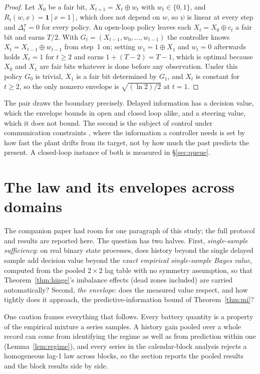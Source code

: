 \documentclass[11pt]{article}
\begin{document}
\begin{proof}
Let $X_0$ be a fair bit, $X_{t+1}=X_t\oplus w_t$ with $w_t\in\{0,1\}$, and
$R_t(w,x)=\mathbf 1[x=1]$, which does not depend on $w$, so
$\psi$ is linear at every step and $\Delta^\pi_t=0$ for every policy. An
open-loop policy leaves each $X_t=X_0\oplus c_t$ a fair bit and earns
$T/2$. With $G_t=(X_{t-1},w_0,\dots,w_{t-1})$ the controller knows
$X_t=X_{t-1}\oplus w_{t-1}$ from step~1 on; setting $w_1=1\oplus X_1$ and
$w_t=0$ afterwards holds $X_t=1$ for $t\ge2$ and earns $1+(T-2)=T-1$, which is
optimal because $X_0$ and $X_1$ are fair bits whatever is done before any
observation. Under this policy $G_0$ is trivial, $X_1$ is a fair bit
determined by $G_1$, and $X_t$ is constant for $t\ge2$, so the only
nonzero envelope is $\sqrt{(\ln 2)/2}$ at $t=1$.
\end{proof}

The pair draws the boundary precisely. Delayed information has a
decision value, which the envelope bounds in open and closed loop alike,
and a steering value, which it does not bound. The second is the subject
of control under communication constraints \cite{tatikondamitter04}, where
the information a controller needs is set by how fast the plant drifts
from its target, not by how much the past predicts the present. A
closed-loop instance of both is measured in \S\ref{sec:queue}.

\section{The law and its envelopes across domains}\label{sec:battery}

The companion paper had room for one paragraph of this study; the full
protocol and results are reported here. The question has two halves. First,
\emph{single-sample sufficiency}: on real binary state processes, does
history beyond the single delayed sample add decision value beyond the
\emph{exact empirical single-sample Bayes value}, computed from the
pooled $2{\times}2$ lag table with no symmetry assumption, so that
Theorem~\ref{thm:hinge}'s imbalance effects (dead zones included) are
carried automatically? Second, \emph{the envelope}: does the measured value
respect, and how tightly does it approach, the predictive-information bound
of Theorem~\ref{thm:mi}?

One caution frames everything that follows. Every battery quantity is a
property of the empirical mixture a series samples. A history gain pooled
over a whole record can come from identifying the regime as well as from
prediction within one (Lemma~\ref{lem:regime}), and every series in the
calendar-block analysis rejects a homogeneous lag-1 law across blocks, so the section reports the
pooled results and the block results side by side.
\end{document}
